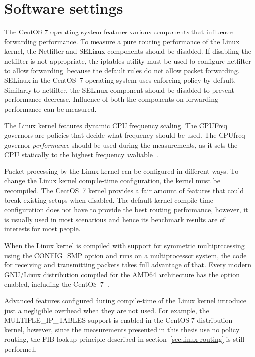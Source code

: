 
\section{Software settings}\label{sec:analysis-settings}
The CentOS 7 operating system features various components that influence forwarding performance.
To measure a pure routing performance of the Linux kernel,
the Netfilter and SELinux components should be disabled.
If disabling the netfilter is not appropriate, the iptables utility must be used to configure netfilter to allow forwarding,
because the default rules do not allow packet forwarding.
SELinux in the CentOS~7 operating system uses enforcing policy by default.
Similarly to netfilter, the SELinux component should be disabled to prevent performance decrease.
Influence of both the components on forwarding performance can be measured.

The Linux kernel features dynamic CPU frequency scaling.
The CPUFreq governors are policies that decide what frequency should be used.
The CPUfreq governor {\it{performance}} should be used during the measurements, as it sets the CPU statically to the
highest frequency avaliable~\cite{cpufreq-governors}. %

Packet processing by the Linux kernel can be configured in different ways.
To change the Linux kernel compile-time configuration, the kernel must be recompiled.
The CentOS~7 kernel provides a fair amount of features that could break existing setups when disabled.
The default kernel compile-time configuration does not have to provide the best routing performance,
however, it is usually used in most scenarious and hence its benchmark results are of interests for most people.

When the Linux kernel is compiled with support for symmetric multiprocessing
using the CONFIG\_SMP option and runs on a multiprocessor system, the code for receiving and
transmitting packets takes full advantage of that.
Every modern GNU/Linux distribution compiled for the AMD64 architecture has the option enabled,
including the CentOS~7~\cite{understanding-internals}.

Advanced features configured during compile-time of the Linux kernel introduce
just a negligible overhead when they are not used.
For example, the MULTIPLE\_IP\_TABLES support is enabled in the CentOS 7 distribution kernel, however,
since the measurements presented in this thesis use no policy routing,
the FIB lookup principle described in section~\ref{sec:linux-routing} is still performed.

